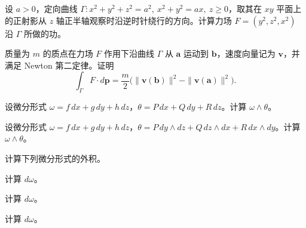 \noindent\begin{minipage}{\textwidth}
设 $a>0$，定向曲线 $\Gamma:x^2+y^2+z^2=a^2,\ x^2+y^2=ax,\ z\ge0$，取其在 $xy$ 平面上的正射影从 $z$ 轴正半轴观察时沿逆时针绕行的方向。计算力场 $F=(y^2,z^2,x^2)$ 沿 $\Gamma$ 所做的功。
\end{minipage}\par\vfill
\noindent\begin{minipage}{\textwidth}
质量为 $m$ 的质点在力场 $F$ 作用下沿曲线 $\Gamma$ 从 $\mathbf a$ 运动到 $\mathbf b$，速度向量记为 $\mathbf v$，并满足 Newton 第二定律。证明\[\int_\Gamma F\cdot d\mathbf p=\frac m2\bigl(\|\mathbf v(\mathbf b)\|^2-\|\mathbf v(\mathbf a)\|^2\bigr).\]
\end{minipage}\par\vfill
\newpage
\noindent\begin{minipage}{\textwidth}
设微分形式 $\omega=f\,dx+g\,dy+h\,dz$，$\theta=P\,dx+Q\,dy+R\,dz$。计算 $\omega\wedge\theta$。
\end{minipage}\par\vfill
\noindent\begin{minipage}{\textwidth}
设微分形式 $\omega=f\,dx+g\,dy+h\,dz$，$\theta=P\,dy\wedge dz+Q\,dz\wedge dx+R\,dx\wedge dy$。计算 $\omega\wedge\theta$。
\end{minipage}\par\vfill
\noindent\begin{minipage}{\textwidth}
计算下列微分形式的外积。
\end{minipage}\par\vfill
\newpage
\noindent\begin{minipage}{\textwidth}
计算 $d\omega$。
\end{minipage}\par\vfill
\noindent\begin{minipage}{\textwidth}
计算 $d\omega$。
\end{minipage}\par\vfill
\noindent\begin{minipage}{\textwidth}
计算 $d\omega$。
\end{minipage}\par\vfill
